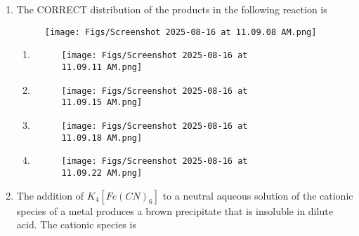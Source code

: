 \documentclass[12pt]{article}
\begin{document}
\begin{enumerate}
\begin{enumerate}
\end{enumerate}




\item The CORRECT distribution of the products in the following reaction is
\begin{figure}[H]
\centering
\texttt{[image: Figs/Screenshot 2025-08-16 at 11.09.08 AM.png]}
\caption{}
\end{figure}
  

\begin{enumerate} 
    \item \begin{figure}[H]
\centering
\texttt{[image: Figs/Screenshot 2025-08-16 at 11.09.11 AM.png]}
\caption{}
\end{figure}

\item  \begin{figure}[H]
\centering
\texttt{[image: Figs/Screenshot 2025-08-16 at 11.09.15 AM.png]}
\caption{}
\end{figure}


\item  \begin{figure}[H]
\centering
\texttt{[image: Figs/Screenshot 2025-08-16 at 11.09.18 AM.png]}
\caption{}
\end{figure}

\item  
\begin{figure}[H]
\centering
\texttt{[image: Figs/Screenshot 2025-08-16 at 11.09.22 AM.png]}
\caption{}
\end{figure}

\end{enumerate}


\item The addition of $K_4[Fe(CN)_6]$ to a neutral aqueous solution of the cationic species of
a metal produces a brown precipitate that is insoluble in dilute acid. The cationic
species is

\begin{enumerate} 
\end{enumerate}




\end{enumerate}
\end{document}
